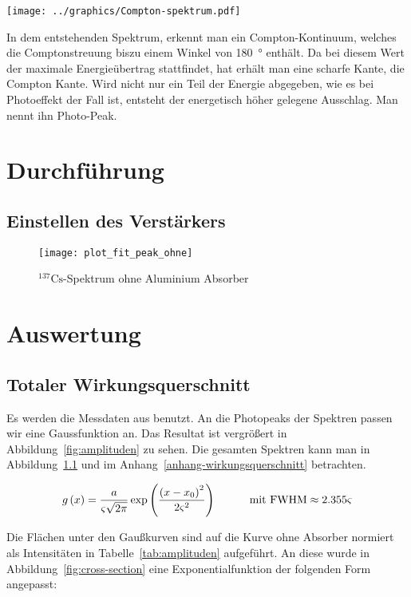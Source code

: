 \documentclass[11pt, ngerman, fleqn, DIV=15, headinclude, BCOR=2cm]{scrreprt}
\newcommand{\plotwidth}{0.8\linewidth}
\begin{document}
\texttt{[image: ../graphics/Compton-spektrum.pdf]}
\parencite{comptoneffekt}

In dem entstehenden Spektrum, erkennt man ein Compton-Kontinuum, welches die 
Comptonstreuung biszu einem Winkel von \SI{180}{\degree} enthält. Da bei diesem
Wert der maximale Energieübertrag stattfindet, hat erhält man eine scharfe Kante, 
die Compton Kante. Wird nicht nur ein Teil der Energie abgegeben, wie es bei 
Photoeffekt der Fall ist, entsteht der energetisch höher gelegene Ausschlag. Man 
nennt ihn Photo-Peak.


\chapter{Durchführung}

\section{Einstellen des Verstärkers}
\begin{figure}[h]
    \centering
    \texttt{[image: plot\_fit\_peak\_ohne]}
    \caption{%
	    $^{137}\text{Cs}$-Spektrum ohne Aluminium Absorber
   }
    \label{fig:plot_fit_peak_ohne}
\end{figure}


\chapter{Auswertung}

\section{Totaler Wirkungsquerschnitt}

Es werden die Messdaten aus \fehlt%
benutzt.
An die Photopeaks der Spektren passen wir eine Gaussfunktion an. Das Resultat
ist vergrößert in Abbildung~\ref{fig:amplituden} zu sehen. Die gesamten
Spektren kann man in Abbildung~\ref{fig:plot_fit_peak_ohne} und im
Anhang~\ref{anhang-wirkungsquerschnitt} betrachten.

\begin{equation}
	g\del x = \frac{a}{\varsigma \sqrt{2 \pi}} \exp\del{\frac{\del
		{x - x_0}^2}{2 \varsigma^2}}
		\quad \quad \quad \text{mit FWHM} \approx 2.355 \varsigma
\end{equation}

Die Flächen unter den Gaußkurven sind auf die Kurve ohne Absorber normiert als
Intensitäten in Tabelle~\ref{tab:amplituden} aufgeführt. An diese wurde in
Abbildung~\ref{fig:cross-section} eine Exponentialfunktion der folgenden Form
angepasst:
\end{document}
